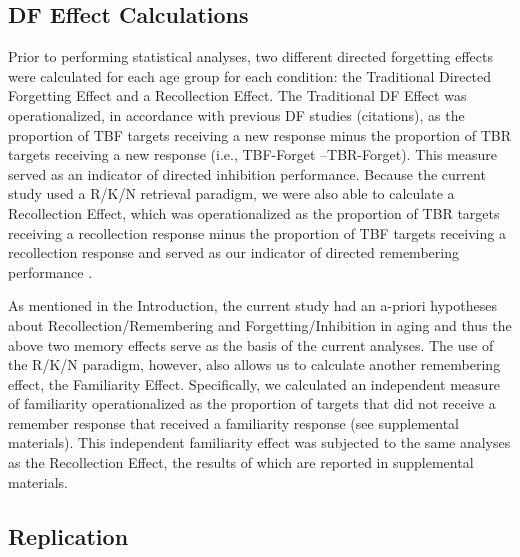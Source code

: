 \documentclass[man]{apa6}\usepackage[]{graphicx}\usepackage[]{color}
\begin{document}
\subsection*{DF Effect Calculations}

Prior to performing statistical analyses, two different directed forgetting effects were calculated for each age group for each condition: the Traditional Directed Forgetting Effect and a Recollection Effect. The Traditional DF Effect was operationalized, in accordance with previous DF studies (citations), as the proportion of TBF targets receiving a new response minus the proportion of TBR targets receiving a new response (i.e., TBF-Forget –TBR-Forget). This measure served as an indicator of directed inhibition performance. Because the current study used a R/K/N retrieval paradigm, we were also able to calculate a Recollection Effect, which was operationalized as the proportion of TBR targets receiving a recollection response minus the proportion of TBF targets receiving a recollection response and served as our indicator of directed remembering performance \parencite{rizio.dennis2014plos}.

As mentioned in the Introduction, the current study had an a-priori hypotheses about Recollection/Remembering and Forgetting/Inhibition in aging and thus the above two memory effects serve as the basis of the current analyses. The use of the R/K/N paradigm, however, also allows us to calculate another remembering effect, the Familiarity Effect. Specifically, we calculated an independent measure of familiarity operationalized as the proportion of targets that did not receive a remember response that received a familiarity response \parencite{yonelinas.jacoby1995remknow,jacoby.yonelinas.jennings1997} (see supplemental materials). This independent familiarity effect was subjected to the same analyses as the Recollection Effect, the results of which are reported in supplemental materials.

\subsection*{Replication}
\end{document}
